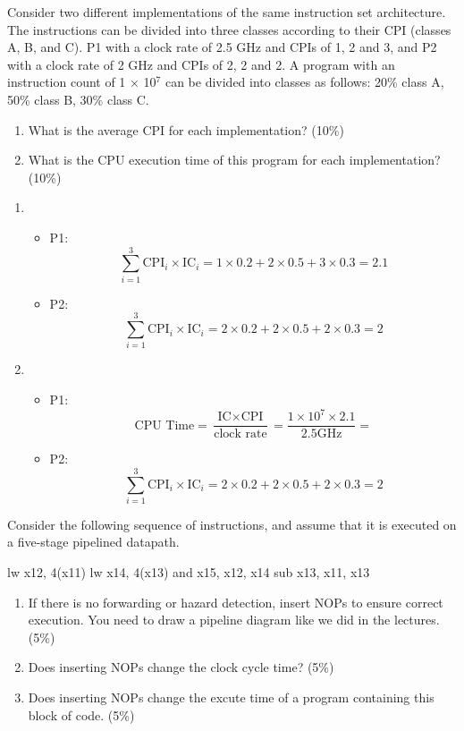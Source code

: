 \documentclass[12pt, a4paper]{article}
\begin{document}
\begin{q}{20}
    Consider two different implementations of the same instruction set architecture. The
instructions can be divided into three classes according to their CPI (classes A, B, and
C). P1 with a clock rate of 2.5 GHz and CPIs of 1, 2 and 3, and P2 with a clock rate of
2 GHz and CPIs of 2, 2 and 2. A program with an instruction count of 1 × 10$^7$ can be
divided into classes as follows: 20\% class A, 50\% class B, 30\% class C. 
\begin{enumerate}
    \item What is the average CPI for each implementation? (10\%)
    \item What is the CPU execution time of this program for each implementation? (10\%)
\end{enumerate}
\end{q}
\begin{ans}
\begin{enumerate}
    \item 
    \begin{itemize}
        \item P1: $$\sum_{i=1}^{3}\text{CPI}_i\times\text{IC}_i = 1\times0.2+2\times0.5+3\times0.3=2.1$$
        \item P2: $$\sum_{i=1}^{3}\text{CPI}_i\times\text{IC}_i = 2\times0.2+2\times0.5+2\times0.3=2$$
    \end{itemize}
    \item 
    \begin{itemize}
        \item P1: $$\text{CPU Time}=\frac{\text{IC}\times\text{CPI}}{\text{clock rate}}=\frac{1\times10^7\times2.1}{2.5\text{GHz}}=$$
        \item P2: $$\sum_{i=1}^{3}\text{CPI}_i\times\text{IC}_i = 2\times0.2+2\times0.5+2\times0.3=2$$
    \end{itemize}
\end{enumerate}
\end{ans}
\pagebreak

\begin{q}{15}
    Consider the following sequence of instructions, and assume that it is executed on a
five-stage pipelined datapath.
\begin{code}
    lw x12, 4(x11)
    lw x14, 4(x13)
    and x15, x12, x14
    sub x13, x11, x13
\end{code}
\begin{enumerate}
    \item If there is no forwarding or hazard detection, insert NOPs to ensure correct execution.
    You need to draw a pipeline diagram like we did in the lectures. (5\%)
    \item Does inserting NOPs change the clock cycle time? (5\%)
    \item Does inserting NOPs change the excute time of a program containing this block of
    code. (5\%)
\end{enumerate}
\end{q}
\begin{ans}
    
\end{ans}
\pagebreak
\end{document}

